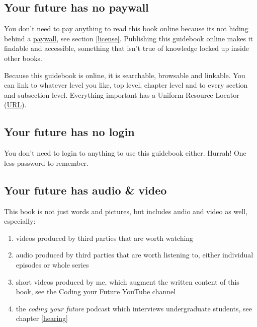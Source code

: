 \documentclass[
]{book}
\providecommand{\tightlist}{%
  \setlength{\itemsep}{0pt}\setlength{\parskip}{0pt}}
\begin{document}
\hypertarget{openaccess}{%
\subsection{Your future has no paywall}\label{openaccess}}

You don't need to pay anything to read this book online because its not hiding behind a \href{https://en.wikipedia.org/wiki/Paywall}{paywall}, see section \ref{license}. Publishing this guidebook online makes it findable and accessible, something that isn't true of knowledge locked up inside other books.

Because this guidebook is online, it is searchable, browsable and linkable. You can link to whatever level you like, top level, chapter level and to every section and subsection level. Everything important has a Uniform Resource Locator (\href{https://en.wikipedia.org/wiki/URL}{URL}).

\hypertarget{nologin}{%
\subsection{Your future has no login}\label{nologin}}

You don't need to login to anything to use this guidebook either. Hurrah! One less password to remember.

\hypertarget{av}{%
\subsection{Your future has audio \& video}\label{av}}

This book is not just words and pictures, but includes audio and video as well, especially:

\begin{enumerate}
\def\labelenumi{\arabic{enumi}.}
\tightlist
\item
  videos produced by third parties that are worth watching
\item
  audio produced by third parties that are worth listening to, either individual episodes or whole series
\item
  short videos produced by me, which augment the written content of this book, see the \href{https://www.youtube.com/channel/UCLBv_u8JmyUPqmRALIjVnLg}{Coding your Future YouTube channel}
\item
  the \emph{coding your future} podcast which interviews undergraduate students, see chapter \ref{hearing}
\end{enumerate}
\end{document}
